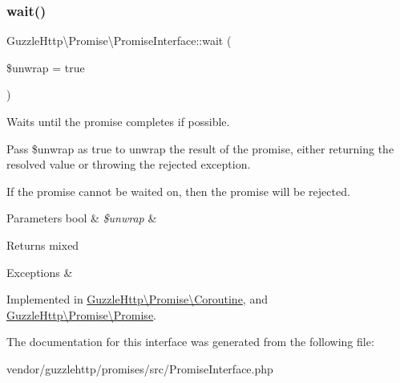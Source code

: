 \subsubsection{\texorpdfstring{wait()}{wait()}}
{\footnotesize\ttfamily Guzzle\+Http\textbackslash{}\+Promise\textbackslash{}\+Promise\+Interface\+::wait (\begin{DoxyParamCaption}\item[{}]{\$unwrap = {\ttfamily true} }\end{DoxyParamCaption})}

Waits until the promise completes if possible.

Pass \$unwrap as true to unwrap the result of the promise, either returning the resolved value or throwing the rejected exception.

If the promise cannot be waited on, then the promise will be rejected.


\begin{DoxyParams}[1]{Parameters}
bool & {\em \$unwrap} & \\
\hline
\end{DoxyParams}
\begin{DoxyReturn}{Returns}
mixed 
\end{DoxyReturn}

\begin{DoxyExceptions}{Exceptions}
{\em } & \\
\hline
\end{DoxyExceptions}


Implemented in \hyperlink{classGuzzleHttp_1_1Promise_1_1Coroutine_ae227b3f676a5ef659ffba497e432cc1b}{Guzzle\+Http\textbackslash{}\+Promise\textbackslash{}\+Coroutine}, and \hyperlink{classGuzzleHttp_1_1Promise_1_1Promise_abada4a05cb1b6e162db6567872415dad}{Guzzle\+Http\textbackslash{}\+Promise\textbackslash{}\+Promise}.



The documentation for this interface was generated from the following file\+:\begin{DoxyCompactItemize}
\item 
vendor/guzzlehttp/promises/src/Promise\+Interface.\+php\end{DoxyCompactItemize}
